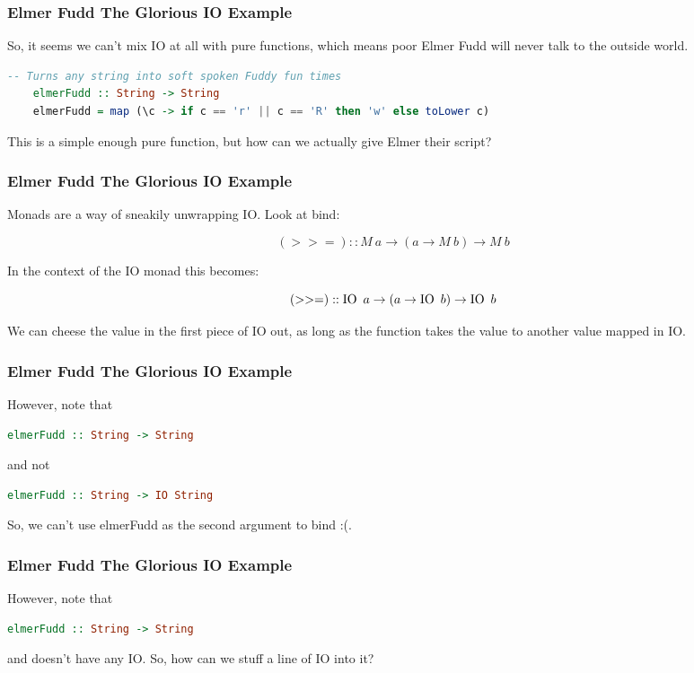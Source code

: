 \documentclass[presentation.tex]{subfiles}
\begin{document}
\begin{frame}[fragile]
  \frametitle{Elmer Fudd The Glorious IO Example}

  So, it seems we can't mix IO at all with pure functions, which means
  poor Elmer Fudd will never talk to the outside world.

  \begin{lstlisting}[frame=single,language=Haskell,breaklines=true]
    -- Turns any string into soft spoken Fuddy fun times
    elmerFudd :: String -> String
    elmerFudd = map (\c -> if c == 'r' || c == 'R' then 'w' else toLower c)
  \end{lstlisting}

  This is a simple enough pure function, but how can we actually give
  Elmer their script?
\end{frame}

\begin{frame}[fragile]
  \frametitle{Elmer Fudd The Glorious IO Example}

  Monads are a way of sneakily unwrapping IO. Look at bind:

  \[(>>=)::M\ a\rightarrow(a\rightarrow M\ b)\rightarrow M\ b\]

  In the context of the IO monad this becomes:

  \[(>>=)::\io\ a\rightarrow(a\rightarrow \io\ b)\rightarrow \io\ b\]

  We can cheese the value in the first piece of IO out, as long as the
  function takes the value to another value mapped in IO.
\end{frame}

\begin{frame}[fragile]
  \frametitle{Elmer Fudd The Glorious IO Example}

  However, note that

  \begin{lstlisting}[frame=single,language=Haskell,breaklines=true]
    elmerFudd :: String -> String
  \end{lstlisting}

  and not

  \begin{lstlisting}[frame=single,language=Haskell,breaklines=true]
    elmerFudd :: String -> IO String
  \end{lstlisting}

  So, we can't use elmerFudd as the second argument to bind :(.
\end{frame}

\begin{frame}[fragile]
  \frametitle{Elmer Fudd The Glorious IO Example}

  However, note that

  \begin{lstlisting}[frame=single,language=Haskell,breaklines=true]
    elmerFudd :: String -> String
  \end{lstlisting}

  and doesn't have any IO. So, how can we stuff a line of IO into it?
\end{frame}
\end{document}
